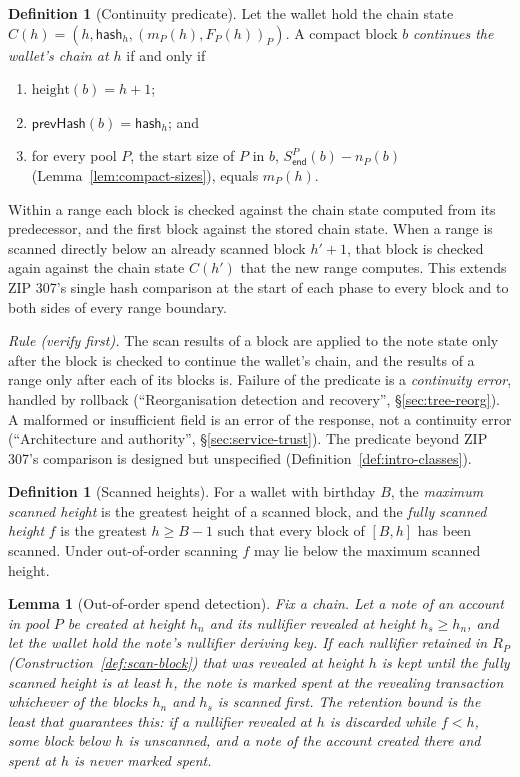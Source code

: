 \documentclass[11pt,a4paper]{article}
\newtheorem{lemma}[theorem]{Lemma}
\theoremstyle{definition}
\newtheorem{definition}[theorem]{Definition}
\begin{document}
\begin{definition}[Continuity predicate]\label{def:scan-continuity}
Let the wallet hold the chain state
$C(h) = (h, \mathsf{hash}_h, (m_P(h), F_P(h))_P)$. A compact block $b$
\emph{continues the wallet's chain at $h$} if and only if
\begin{enumerate}[label=(\roman*)]
\item $\mathrm{height}(b) = h + 1$;
\item $\mathsf{prevHash}(b) = \mathsf{hash}_h$; and
\item for every pool $P$, the start size of $P$ in $b$,
  $S^{P}_{\mathsf{end}}(b) - n_P(b)$ (Lemma~\ref{lem:compact-sizes}),
  equals $m_P(h)$.
\end{enumerate}
Within a range each block is checked against the chain state computed from
its predecessor, and the first block against the stored chain state. When
a range is scanned directly below an already scanned block $h' + 1$, that
block is checked again against the chain state $C(h')$ that the new range
computes. This extends ZIP 307's single hash comparison at the start of
each phase to every block and to both sides of every range boundary.

\emph{Rule (verify first).} The scan results of a block are applied to the
note state only after the block is checked to continue the wallet's chain,
and the results of a range only after each of its blocks is. Failure of the
predicate is a \emph{continuity error}, handled by rollback
(``Reorganisation detection and recovery'', \S\ref{sec:tree-reorg}). A
malformed or insufficient field is an error of the response, not a
continuity error (``Architecture and authority'',
\S\ref{sec:service-trust}). The predicate beyond ZIP 307's comparison is
designed but unspecified (Definition~\ref{def:intro-classes}).
\end{definition}

\begin{definition}[Scanned heights]\label{def:scan-heights}
For a wallet with birthday $B$, the \emph{maximum scanned height} is the
greatest height of a scanned block, and the \emph{fully scanned height} $f$
is the greatest $h \ge B - 1$ such that every block of $[B, h]$ has been
scanned. Under out-of-order scanning $f$ may lie below the maximum scanned
height.
\end{definition}

\begin{lemma}[Out-of-order spend detection]\label{lem:scan-spends}
Fix a chain. Let a note of an account in pool $P$ be created at height
$h_n$ and its nullifier revealed at height $h_s \ge h_n$, and let the wallet
hold the note's nullifier deriving key. If each nullifier retained in $R_P$
(Construction~\ref{def:scan-block}) that was revealed at height $h$ is kept
until the fully scanned height is at least $h$, the note is marked spent at
the revealing transaction whichever of the blocks $h_n$ and $h_s$ is scanned
first. The retention bound is the least that guarantees this: if a
nullifier revealed at $h$ is discarded while $f < h$, some block below $h$
is unscanned, and a note of the account created there and spent at $h$ is
never marked spent.
\end{lemma}
\end{document}
